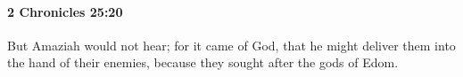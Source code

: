 
		\paragraph{2 Chronicles 25:20} %
			\label{2CHRONICLES-25-20}

			But Amaziah would not hear; for it came of God, that he might deliver them into the hand of their enemies, because they sought after the gods of Edom.


